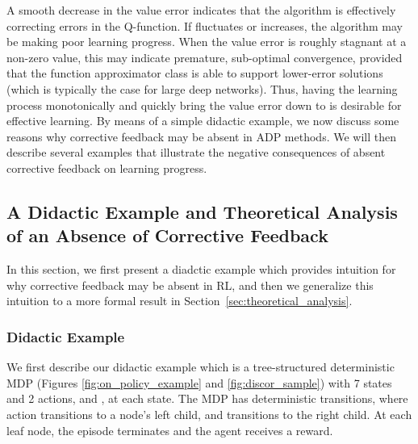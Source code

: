\documentclass[jmlr]{article}
\begin{document}
A smooth decrease in the value error  indicates that the algorithm is effectively correcting errors in the Q-function. If  fluctuates or increases, the algorithm may be making poor learning progress. When the value error  is roughly stagnant at a non-zero value, this may indicate premature, sub-optimal convergence, provided that the function approximator class is able to support lower-error solutions (which is typically the case for large deep networks).
Thus, having the learning process monotonically and quickly bring the value error  down to  is desirable for effective learning.
By means of a simple didactic example, we now discuss some reasons why corrective feedback may be absent in ADP methods. We will then describe several examples that illustrate the negative consequences of absent corrective feedback on learning progress.

\subsection{A Didactic Example and Theoretical Analysis of an Absence of Corrective Feedback}
\label{sec:didactic_example_and_theory}

In this section, we first present a diadctic example which provides intuition for why corrective feedback may be absent in RL, and then we generalize this intuition to a more formal result in Section~\ref{sec:theoretical_analysis}.

\subsubsection{Didactic Example}
\label{sec:didactice_example}
{We first describe our didactic example which is a tree-structured deterministic MDP (Figures \ref{fig:on_policy_example} and \ref{fig:discor_sample}) with 7 states and 2 actions,  and , at each state. The MDP has deterministic transitions, where action  transitions to a node's left child, and  transitions to the right child. At each leaf node, the episode terminates and the agent receives a reward.}
\end{document}
